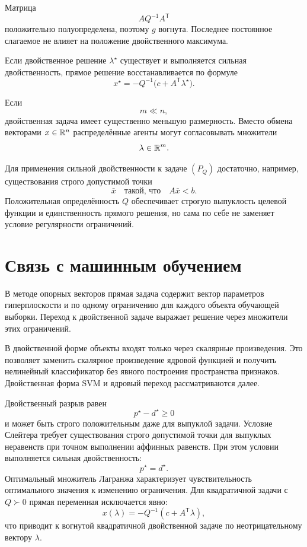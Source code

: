 Матрица
\[
    AQ^{-1}A^{\mathsf T}
\]
положительно полуопределена, поэтому \(g\) вогнута. Последнее
постоянное слагаемое не влияет на положение двойственного
максимума.

Если двойственное решение \(\lambda^\star\) существует и выполняется
сильная двойственность, прямое решение восстанавливается по формуле
\[
    x^\star
    =
    -Q^{-1}
    \bigl(
        c+A^{\mathsf T}\lambda^\star
    \bigr).
\]

Если
\[
    m\ll n,
\]
двойственная задача имеет существенно меньшую размерность. Вместо
обмена векторами \(x\in\mathbb{R}^n\) распределённые агенты могут
согласовывать множители
\[
    \lambda\in\mathbb{R}^m.
\]

\begin{remark}
Для применения сильной двойственности к задаче \((P_Q)\) достаточно,
например, существования строго допустимой точки
\[
    \bar x
    \quad\text{такой, что}\quad
    A\bar x<b.
\]
Положительная определённость \(Q\) обеспечивает строгую выпуклость
целевой функции и единственность прямого решения, но сама по себе не
заменяет условие регулярности ограничений.
\end{remark}

\section{Связь с машинным обучением}

В методе опорных векторов прямая задача содержит вектор параметров
гиперплоскости и по одному ограничению для каждого объекта обучающей
выборки. Переход к двойственной задаче выражает решение через
множители этих ограничений.

В двойственной форме объекты входят только через скалярные
произведения. Это позволяет заменить скалярное произведение
ядровой функцией и получить нелинейный классификатор без явного
построения пространства признаков. Двойственная форма SVM и
ядровый переход рассматриваются далее.

\begin{lecturesummary}
Двойственный разрыв равен
\[
    p^\star-d^\star\ge0
\]
и может быть строго положительным даже для выпуклой задачи. Условие
Слейтера требует существования строго допустимой точки для выпуклых
неравенств при точном выполнении аффинных равенств. При этом условии
выполняется сильная двойственность:
\[
    p^\star=d^\star.
\]
Оптимальный множитель Лагранжа характеризует чувствительность
оптимального значения к изменению ограничения. Для квадратичной
задачи с \(Q\succ0\) прямая переменная исключается явно:
\[
    x(\lambda)
    =
    -Q^{-1}(c+A^{\mathsf T}\lambda),
\]
что приводит к вогнутой квадратичной двойственной задаче по
неотрицательному вектору \(\lambda\).
\end{lecturesummary}